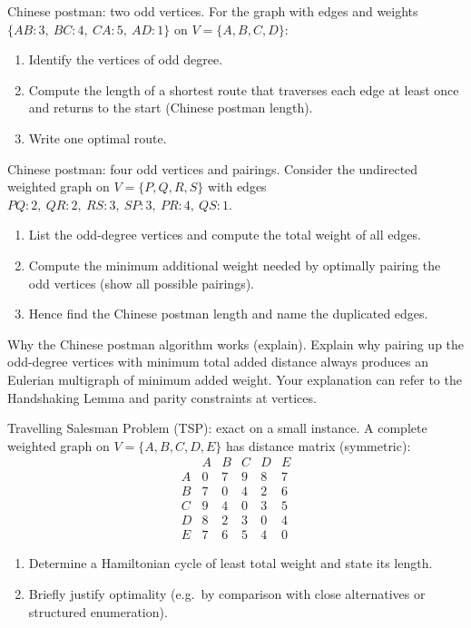 \documentclass[11pt]{article}
\def\textbf#1{#1}%
\newcounter{question}
\begin{document}
\begin{question}
\textbf{Chinese postman: two odd vertices.}
For the graph with edges and weights $\{AB\!:\!3,\ BC\!:\!4,\ CA\!:\!5,\ AD\!:\!1\}$ on $V=\{A,B,C,D\}$:
\begin{enumerate}
  \item Identify the vertices of odd degree.
  \item Compute the length of a shortest route that traverses each edge at least once and returns to the start (Chinese postman length).
  \item Write one optimal route.
\end{enumerate}
\end{question}

\begin{question}
\textbf{Chinese postman: four odd vertices and pairings.}
Consider the undirected weighted graph on $V=\{P,Q,R,S\}$ with edges
$PQ\!:\!2,\ QR\!:\!2,\ RS\!:\!3,\ SP\!:\!3,\ PR\!:\!4,\ QS\!:\!1$.
\begin{enumerate}
  \item List the odd-degree vertices and compute the total weight of all edges.
  \item Compute the minimum additional weight needed by optimally pairing the odd vertices (show all possible pairings).
  \item Hence find the Chinese postman length and name the duplicated edges.
\end{enumerate}
\end{question}

\begin{question}
\textbf{Why the Chinese postman algorithm works (explain).}
Explain why pairing up the odd-degree vertices with minimum total added distance always produces an Eulerian multigraph of minimum added weight. Your explanation can refer to the Handshaking Lemma and parity constraints at vertices.
\end{question}

\begin{question}
\textbf{Travelling Salesman Problem (TSP): exact on a small instance.}
A complete weighted graph on $V=\{A,B,C,D,E\}$ has distance matrix (symmetric):
\[
\begin{array}{c|ccccc}
 & A&B&C&D&E\\\hline
A&0&7&9&8&7\\
B&7&0&4&2&6\\
C&9&4&0&3&5\\
D&8&2&3&0&4\\
E&7&6&5&4&0
\end{array}
\]
\begin{enumerate}
  \item Determine a Hamiltonian cycle of least total weight and state its length.
  \item Briefly justify optimality (e.g.\ by comparison with close alternatives or structured enumeration).
\end{enumerate}
\end{question}
\end{document}
